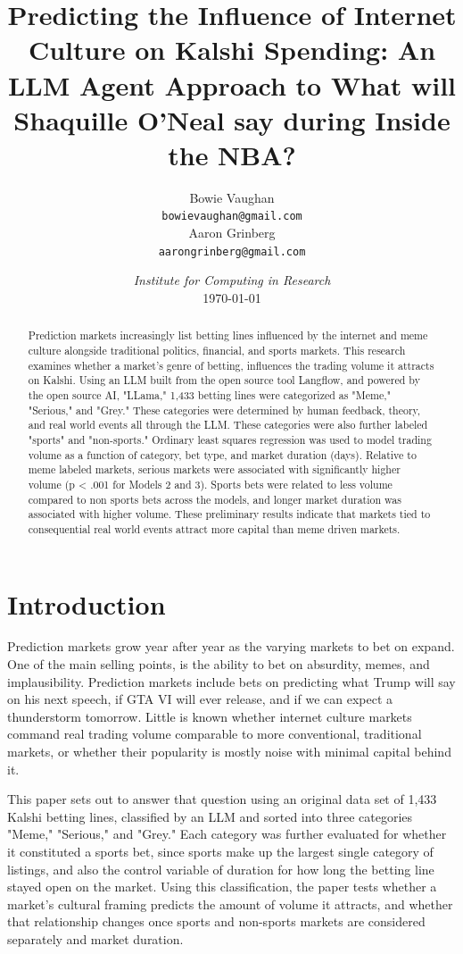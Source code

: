 \documentclass{article}
\title{Predicting the Influence of Internet Culture on Kalshi Spending: An LLM Agent Approach to What will Shaquille O'Neal say during Inside the NBA?}
\author{
    Bowie Vaughan \\
    \texttt{bowievaughan@gmail.com} \\
    \And
    Aaron Grinberg \\
    \texttt{aarongrinberg@gmail.com} \\
}
\date{\textit{Institute for Computing in Research} \\[4mm] \today}
\begin{document}
\maketitle

\begin{abstract}
	Prediction markets increasingly list betting lines influenced by the internet and meme culture alongside traditional politics, financial, and sports markets. This research examines whether a market's genre of betting, influences the trading volume it attracts on Kalshi. Using an LLM built from the open source tool Langflow, and powered by the open source AI, "LLama," 1,433 betting lines were categorized as "Meme," "Serious," and "Grey." These categories were determined by human feedback, theory, and real world events all through the LLM. These categories were also further labeled "sports" and "non-sports." Ordinary least squares regression was used to model trading volume as a function of category, bet type, and market duration (days). Relative to meme labeled markets, serious markets were associated with significantly higher volume (p < .001 for Models 2 and 3). Sports bets were related to less volume compared to non sports bets across the models, and longer market duration was associated with higher volume. These preliminary results indicate that markets tied to consequential real world events attract more capital than meme driven markets. 
\end{abstract}



\section{Introduction}
Prediction markets grow year after year as the varying markets to bet on expand. One of the main selling points, is the ability to bet on absurdity, memes, and implausibility. Prediction markets include bets on predicting what Trump will say on his next speech, if GTA VI will ever release, and if we can expect a thunderstorm tomorrow. Little is known whether internet culture markets command real trading volume comparable to more conventional, traditional markets, or whether their popularity is mostly noise with minimal capital behind it. 

This paper sets out to answer that question using an original data set of 1,433 Kalshi betting lines, classified by an LLM and sorted into three categories "Meme," "Serious," and "Grey." Each category was further evaluated for whether it constituted a sports bet, since sports make up the largest single category of listings, and also the control variable of duration for how long the betting line stayed open on the market. Using this classification, the paper tests whether a market's cultural framing predicts the amount of volume it attracts, and whether that relationship changes once sports and non-sports markets are considered separately and market duration.
\end{document}
